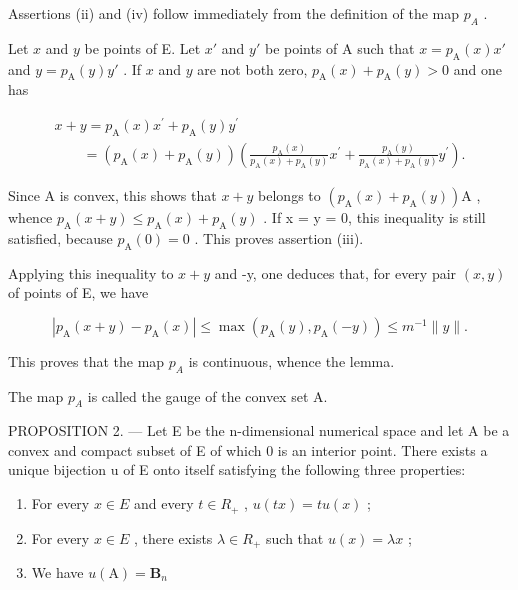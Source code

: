 Assertions (ii) and (iv) follow immediately from the definition of the map \(p_{A}\) .

Let \(x\) and \(y\) be points of E. Let \(x'\) and \(y'\) be points of A such that \(x = p_{\mathrm{A}}(x)x'\) and \(y = p_{\mathrm{A}}(y)y'\) . If \(x\) and \(y\) are not both zero, \(p_{\mathrm{A}}(x) + p_{\mathrm{A}}(y) > 0\) and one has

\[
\begin{array}{l} x + y = p _ {\mathrm{A}} (x) x ^ {\prime} + p _ {\mathrm{A}} (y) y ^ {\prime} \\ \qquad = (p _ {\mathrm{A}} (x) + p _ {\mathrm{A}} (y)) \left(\frac {p _ {\mathrm{A}} (x)}{p _ {\mathrm{A}} (x) + p _ {\mathrm{A}} (y)} x ^ {\prime} + \frac {p _ {\mathrm{A}} (y)}{p _ {\mathrm{A}} (x) + p _ {\mathrm{A}} (y)} y ^ {\prime}\right). \end{array}
\]

Since A is convex, this shows that \(x + y\) belongs to \((p_{\mathrm{A}}(x) + p_{\mathrm{A}}(y))\mathrm{A}\) , whence \(p_{\mathrm{A}}(x + y) \leqslant p_{\mathrm{A}}(x) + p_{\mathrm{A}}(y)\) . If x = y = 0, this inequality is still satisfied, because \(p_{\mathrm{A}}(0) = 0\) . This proves assertion (iii).

Applying this inequality to \(x + y\) and -y, one deduces that, for every pair \((x, y)\) of points of E, we have

\[
| p _ {\mathrm{A}} (x + y) - p _ {\mathrm{A}} (x) | \leqslant \max (p _ {\mathrm{A}} (y), p _ {\mathrm{A}} (- y)) \leqslant m ^ {- 1} \| y \|.
\]

This proves that the map \(p_{A}\) is continuous, whence the lemma.

The map \(p_{A}\) is called the gauge of the convex set A.

PROPOSITION 2. --- Let E be the n-dimensional numerical space and let A be a convex and compact subset of E of which 0 is an interior point. There exists a unique bijection u of E onto itself satisfying the following three properties:

\begin{enumerate}
\def\labelenumi{(\roman{enumi})}
\item
  For every \(x \in E\) and every \(t \in R_{+}\) , \(u(tx) = tu(x)\) ;
\item
  For every \(x \in E\) , there exists \(\lambda \in R_{+}\) such that \(u(x) = \lambda x\) ;
\item
  We have \(u(\mathrm{A}) = \mathbf{B}_n\)
\end{enumerate}

